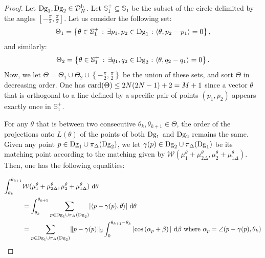 \begin{proof}
Let $\mathrm{Dg}_1,\mathrm{Dg}_2\in{\mathcal D}_N^{\rm b}$. %
Let $\mathbb{S}^+_1\subseteq\mathbb{S}_1$ be the subset of the circle delimited by the angles $\left[-\frac{\pi}{2},\frac{\pi}{2}\right]$.
Let us consider the following set:
$$\Theta_1 = \left\{\theta\in \mathbb{S}^+_1\,:\,\exists p_1,p_2\in \dg_1{\rm\ :\ }\langle\theta,p_2-p_1\rangle=0\right\},$$
and similarly:
$$\Theta_2 = \left\{\theta\in \mathbb{S}^+_1\,:\,\exists q_1,q_2\in \dg_2{\rm\ :\ }\langle\theta,q_2-q_1\rangle=0\right\}.$$
Now, we let $\Theta=\Theta_1\cup\Theta_2\cup\left\{-\frac{\pi}{2},\frac{\pi}{2}\right\}$ be the union of these sets, 
and sort $\Theta$ in decreasing order.
One has ${\rm card}(\Theta)\leq 2N(2N-1)+2=M+1$ since a vector $\theta$ that is orthogonal to a line defined by a specific pair of 
points $(p_1,p_2)$ appears exactly once in $\mathbb{S}_1^+$.

For any $\theta$ that is between two consecutive $\theta_k,\theta_{k+1}\in\Theta$, the order of the projections 
onto $L(\theta)$ of the points of both $\mathrm{Dg}_1$ and $\mathrm{Dg}_2$ remains the same. Given any point $p\in \mathrm{Dg}_1\cup\pi_\Delta(\mathrm{Dg}_2)$, 
we let $\gamma(p)\in \mathrm{Dg}_2\cup\pi_\Delta(\mathrm{Dg}_1)$ be its matching point according 
to the matching given by $\mathcal W(\mu_1^\theta+\mu_{2\Delta}^\theta,\mu_2^\theta+\mu_{1\Delta}^\theta)$.
Then, one has the following equalities:

\begin{align}
\int_{\theta_k}^{\theta_{k+1}}&\mathcal W(\mu_1^\theta+\mu_{2\Delta}^\theta,\mu_2^\theta+\mu_{1\Delta}^\theta)\ {\rm d}\theta\nonumber\\
&=\int_{\theta_k}^{\theta_{k+1}}\underset{p\in \dg_1\cup\pi_\Delta(\dg_2)}{\sum}|\langle p-\gamma(p),\theta\rangle|\ {\rm d}\theta\nonumber\\
&=\underset{p\in \dg_1\cup\pi_\Delta(\dg_2)}{\sum}\|p-\gamma(p)\|_2\int_0^{\theta_{k+1}-\theta_k}|{\rm cos}\left(\alpha_p+\beta\right)
|\ {\rm d}\beta{\rm\ where\ }\alpha_p=\angle(p-\gamma(p),\theta_k)\nonumber
\end{align}



\end{proof}
